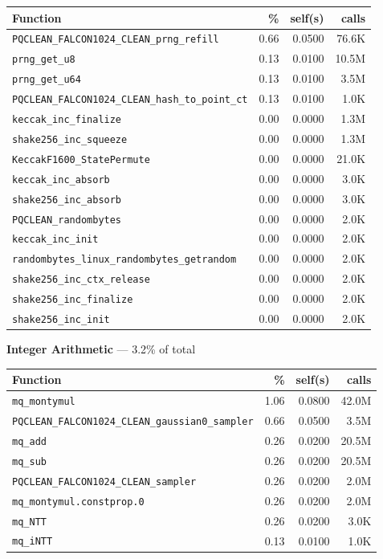 \documentclass[11pt,a4paper]{article}
\begin{document}
\begin{longtable}{p{7.5cm}rrr}
\toprule
Function & \% & self(s) & calls \\
\midrule
\endhead
  \texttt{PQCLEAN\_FALCON1024\_CLEAN\_prng\_refill} & 0.66 & 0.0500 & 76.6K \\
  \texttt{prng\_get\_u8} & 0.13 & 0.0100 & 10.5M \\
  \texttt{prng\_get\_u64} & 0.13 & 0.0100 & 3.5M \\
  \texttt{PQCLEAN\_FALCON1024\_CLEAN\_hash\_to\_point\_ct} & 0.13 & 0.0100 & 1.0K \\
  \texttt{keccak\_inc\_finalize} & 0.00 & 0.0000 & 1.3M \\
  \texttt{shake256\_inc\_squeeze} & 0.00 & 0.0000 & 1.3M \\
  \texttt{KeccakF1600\_StatePermute} & 0.00 & 0.0000 & 21.0K \\
  \texttt{keccak\_inc\_absorb} & 0.00 & 0.0000 & 3.0K \\
  \texttt{shake256\_inc\_absorb} & 0.00 & 0.0000 & 3.0K \\
  \texttt{PQCLEAN\_randombytes} & 0.00 & 0.0000 & 2.0K \\
  \texttt{keccak\_inc\_init} & 0.00 & 0.0000 & 2.0K \\
  \texttt{randombytes\_linux\_randombytes\_getrandom} & 0.00 & 0.0000 & 2.0K \\
  \texttt{shake256\_inc\_ctx\_release} & 0.00 & 0.0000 & 2.0K \\
  \texttt{shake256\_inc\_finalize} & 0.00 & 0.0000 & 2.0K \\
  \texttt{shake256\_inc\_init} & 0.00 & 0.0000 & 2.0K \\
\bottomrule
\end{longtable}

\noindent\colorbox{intcolor}{\strut \textbf{Integer Arithmetic} --- 3.2\% of total}
\vspace{2pt}

\begin{longtable}{p{7.5cm}rrr}
\toprule
Function & \% & self(s) & calls \\
\midrule
\endhead
  \texttt{mq\_montymul} & 1.06 & 0.0800 & 42.0M \\
  \texttt{PQCLEAN\_FALCON1024\_CLEAN\_gaussian0\_sampler} & 0.66 & 0.0500 & 3.5M \\
  \texttt{mq\_add} & 0.26 & 0.0200 & 20.5M \\
  \texttt{mq\_sub} & 0.26 & 0.0200 & 20.5M \\
  \texttt{PQCLEAN\_FALCON1024\_CLEAN\_sampler} & 0.26 & 0.0200 & 2.0M \\
  \texttt{mq\_montymul.constprop.0} & 0.26 & 0.0200 & 2.0M \\
  \texttt{mq\_NTT} & 0.26 & 0.0200 & 3.0K \\
  \texttt{mq\_iNTT} & 0.13 & 0.0100 & 1.0K \\
\bottomrule
\end{longtable}
\end{document}
